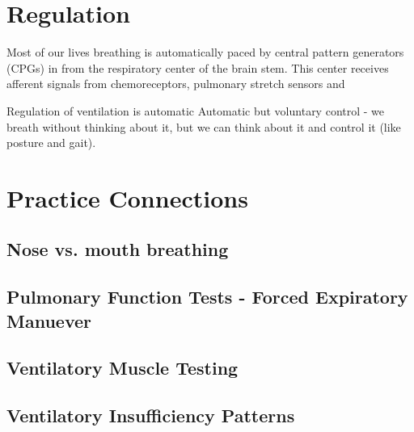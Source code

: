 \section{Regulation}
Most of our lives breathing is automatically paced by central pattern generators (CPGs) in from the respiratory center of the brain stem. This center receives afferent signals from chemoreceptors, pulmonary stretch sensors and

Regulation of ventilation is automatic 
Automatic but voluntary control - we breath without thinking about it, but we can think about it and control it (like posture and gait).





\section{Practice Connections}

\subsection{Nose vs. mouth breathing}

\subsection{Pulmonary Function Tests - Forced Expiratory Manuever}

\subsection{Ventilatory Muscle Testing}

\subsection{Ventilatory Insufficiency Patterns}

\printbibliography[heading=subbibintoc]